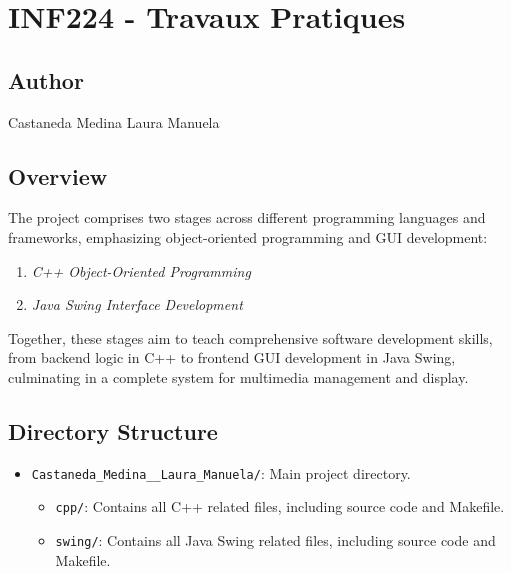 \documentclass[
]{article}
\author{}
\date{}
\providecommand{\tightlist}{%
  \setlength{\itemsep}{0pt}\setlength{\parskip}{0pt}}
\begin{document}
\section{INF224 - Travaux Pratiques}\label{inf224---travaux-pratiques}

\subsection{Author}\label{author}

Castaneda Medina Laura Manuela

\subsection{Overview}\label{overview}

The project comprises two stages across different programming languages
and frameworks, emphasizing object-oriented programming and GUI
development:

\begin{enumerate}
\def\labelenumi{\arabic{enumi}.}
\item
  \emph{C++ Object-Oriented Programming}
\item
  \emph{Java Swing Interface Development}
\end{enumerate}

Together, these stages aim to teach comprehensive software development
skills, from backend logic in C++ to frontend GUI development in Java
Swing, culminating in a complete system for multimedia management and
display.

\subsection{Directory Structure}\label{directory-structure}

\begin{itemize}
\tightlist
\item
  \texttt{Castaneda\_Medina\_\_Laura\_Manuela/}: Main project directory.

  \begin{itemize}
  \tightlist
  \item
    \texttt{cpp/}: Contains all C++ related files, including source code
    and Makefile.
  \item
    \texttt{swing/}: Contains all Java Swing related files, including
    source code and Makefile.
  \end{itemize}
\end{itemize}
\end{document}
